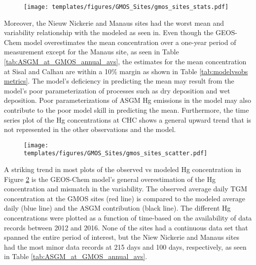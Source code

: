 \begin{figure}[H]
\texttt{[image: templates/figures/GMOS\_Sites/gmos\_sites\_stats.pdf]}
\centering
{}
\label{fig:gmos_sites_stats}
\end{figure}
\FloatBarrier
\begin{flushleft}
Moreover, the Nieuw Nickerie and Manaus sites had the worst mean and variability relationship with the modeled \hg as seen in. Even though the GEOS-Chem model overestimates the mean concentration over a one-year period of measurement except for the Manaus site, as seen in Table \ref{tab:ASGM_at_GMOS_annual_avs}, the estimates for the mean concentration at Sisal and Calhau are within a 10\% margin as shown in Table \ref{tab:modelvsobs metrics}. The model's deficiency in predicting the mean may result from the model's poor parameterization of processes such as dry deposition and wet deposition. Poor parameterizations of ASGM Hg emissions in the model may also  contribute to the poor model skill in predicting the mean. Furthermore, the time series plot of the Hg concentrations at CHC shows a general upward trend that is not represented in the other observations and the model. 
\end{flushleft}


\begin{flushleft}
  \begin{figure}[H]
\texttt{[image: templates/figures/GMOS\_Sites/gmos\_sites\_scatter.pdf]}
\centering
{}
\label{fig:gmos_sites_scatter}
\end{figure}
\FloatBarrier
\end{flushleft}

\begin{flushleft}
A striking trend in most plots of the observed vs modeled Hg concentration in Figure \ref{fig:gmos_sites_scatter} is the GEOS-Chem model's general overestimation of the Hg concentration and mismatch in the variability. The observed average daily TGM concentration at the GMOS sites (red line) is compared to the modeled \on average daily \hg (blue line) and the ASGM contribution (black line). The different Hg concentrations were plotted as a function of time-based on the availability of data records between 2012 and 2016. None of the sites had a continuous data set that spanned the entire period of interest, but the Niew Nickerie and Manaus sites had the most minor data records at 215 days and 100 days, respectively, as seen in Table \ref{tab:ASGM_at_GMOS_annual_avs}.   
\end{flushleft}

